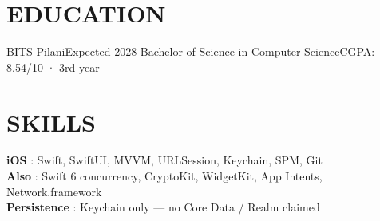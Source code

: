 \section{EDUCATION}
  \resumeSubHeadingListStart
    \resumeSubheading
      {BITS Pilani}{Expected 2028}
      {Bachelor of Science in Computer Science}{CGPA: 8.54/10 · 3rd year}
  \resumeSubHeadingListEnd

\section{SKILLS}
 \begin{itemize}[leftmargin=0in, label={}]
    \small{\item{
     \textbf{iOS} {: Swift, SwiftUI, MVVM, URLSession, Keychain, SPM, Git} \vspace{1pt} \\
     \textbf{Also} {: Swift 6 concurrency, CryptoKit, WidgetKit, App Intents, Network.framework} \vspace{1pt} \\
     \textbf{Persistence} {: Keychain only --- no Core Data / Realm claimed}
    }}
 \end{itemize}


